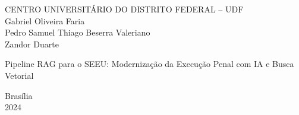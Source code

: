 \begin{center}

{\ABNTEXchapterfont\large CENTRO UNIVERSITÁRIO DO DISTRITO FEDERAL -- UDF}\\
\vspace{2cm}
{\ABNTEXchapterfont\Large
Gabriel Oliveira Faria\\
Pedro Samuel Thiago Beserra Valeriano\\
Zandor Duarte}

\vspace{3cm}
{\ABNTEXchapterfont\Large Pipeline RAG para o SEEU: Modernização da Execução Penal com IA e Busca Vetorial}
\vspace{6cm}
\end{center}
\begin{flushright}
Brasília\\
2024
\end{flushright}

